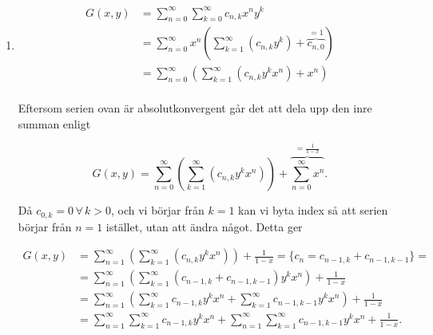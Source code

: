 \documentclass{article}
\begin{document}
\begin{enumerate}[label=(\roman*)]
	\item
		\begin{equation*}
			\begin{aligned}
				G(x,y) &= \sum\limits_{n=0}^\infty \sum\limits_{k=0}^\infty c_{n,k} x^{n} y^{k}\\
				       &= \sum\limits_{n=0}^\infty x^{n} \left( \sum\limits_{k=1}^\infty \left( c_{n,k} y^{k} \right) + \overbrace{c_{n,0}}^\text{$=1$}  \right) \\
				       &= \sum\limits_{n=0}^\infty\left( \sum\limits_{k=1}^\infty\left( c_{n,k} y^{k} x^{n} \right) + x^{n} \right) \\
			\end{aligned}	
		\end{equation*}

		Eftersom serien ovan är absolutkonvergent går det att dela upp den inre summan enligt
				        
		\begin{equation*}
			G(x,y) = \sum\limits_{n=0}^\infty\left( \sum\limits_{k=1}^\infty\left( c_{n,k} y^{k} x^{n} \right) \right) + \overbrace{\sum\limits_{n=0}^\infty x^{n}}^\text{$=\frac{1}{1 - x}$}.
		\end{equation*}

		Då $c_{0,k} = 0 \, \forall \, k > 0$, och vi börjar från $k = 1$ kan vi byta index så att serien börjar från $n = 1$ istället, utan att ändra något. Detta ger

		\begin{equation*}
			\begin{aligned}
				G(x,y) &= \sum\limits_{n=1}^\infty\left( \sum\limits_{k=1}^\infty\left( c_{n,k} y^{k} x^{n} \right) \right) + \frac{1}{1 - x} = \{ c_{n} = c_{n-1, k} + c_{n-1, k-1}\} =\\
				       &= \sum\limits_{n=1}^\infty\left( \sum\limits_{k=1}^\infty\left( c_{n-1,k} + c_{n-1, k-1} \right) y^{k} x^{n} \right) + \frac{1}{1 - x}\\
				       &= \sum\limits_{n=1}^\infty\left( \sum\limits_{k=1}^\infty c_{n-1,k} y^{k} x^{n} + \sum\limits_{k=1}^{\infty} c_{n-1, k-1} y^{k} x^{n} \right) + \frac{1}{1 - x}\\
				       &= \sum\limits_{n=1}^\infty \sum\limits_{k=1}^\infty c_{n-1,k} y^{k} x^{n} + \sum\limits_{n=1}^\infty \sum\limits_{k=1}^{\infty} c_{n-1, k-1} y^{k} x^{n} + \frac{1}{1 - x}.
			\end{aligned}
		\end{equation*}


\end{enumerate}
\end{document}
